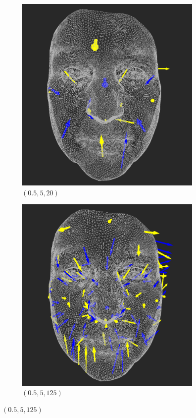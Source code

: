 \begin{figure}[h]
\centering
	\begin{subfigure}{0.4\textwidth}
	\includegraphics[width=\textwidth]{./img/meshdiff-arrows-interval0_5-5-count20-single.png}
    \caption{\((0.5,5,20)\)}
    \label{fig:meshdiff-arrows_5-20}
	\end{subfigure}
    \qquad
    \begin{subfigure}{0.4\textwidth}
	\includegraphics[width=\textwidth]{./img/meshdiff-arrows-interval0_5-5-count125-single.png}
    \caption{\((0.5,5,125)\)}
    \label{fig:meshdiff-arrows_5-125}
	\end{subfigure}
    

\end{figure}
